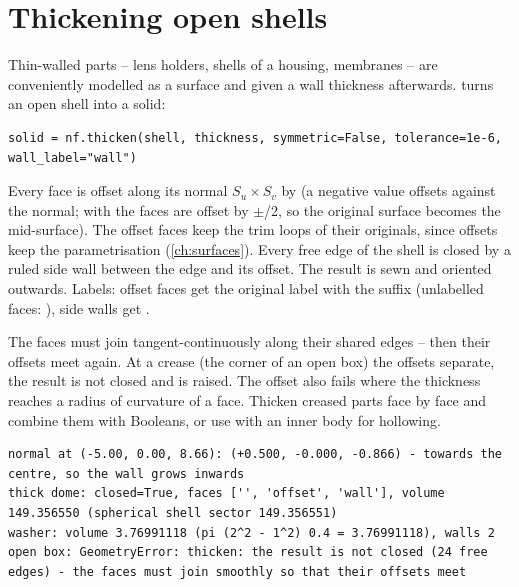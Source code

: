 \section{Thickening open shells}\label{sec:thicken}

Thin-walled parts -- lens holders, shells of a housing, membranes -- are conveniently modelled
as a surface and given a wall thickness afterwards.  turns an open shell into a
solid:

\begin{lstlisting}
solid = nf.thicken(shell, thickness, symmetric=False, tolerance=1e-6, wall_label="wall")
\end{lstlisting}

Every face is offset along its normal $S_u\times S_v$ by  (a negative value
offsets against the normal; with  the faces are offset by
$\pm$/2, so the original surface becomes the mid-surface). The offset faces keep
the trim loops of their originals, since offsets keep the parametrisation
(\cref{ch:surfaces}). Every free edge of the shell is closed by a ruled side wall between the
edge and its offset. The result is sewn and oriented outwards. Labels: offset faces get the
original label with the suffix  (unlabelled faces: ), side walls get
.

\begin{warning}
The faces must join tangent-continuously along their shared edges -- then their offsets meet
again. At a crease (the corner of an open box) the offsets separate, the result is not closed
and  is raised. The offset also fails where the thickness reaches a radius
of curvature of a face. Thicken creased parts face by face and combine them with Booleans, or
use  with an inner body for hollowing.
\end{warning}


\begin{lstlisting}[style=text]
normal at (-5.00, 0.00, 8.66): (+0.500, -0.000, -0.866) - towards the centre, so the wall grows inwards
thick dome: closed=True, faces ['', 'offset', 'wall'], volume 149.356550 (spherical shell sector 149.356551)
washer: volume 3.76991118 (pi (2^2 - 1^2) 0.4 = 3.76991118), walls 2
open box: GeometryError: thicken: the result is not closed (24 free edges) - the faces must join smoothly so that their offsets meet
\end{lstlisting}

